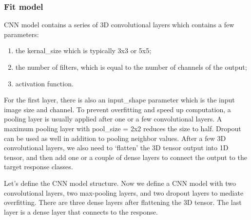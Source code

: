 \documentclass[12pt,]{krantz}
\begin{document}
\hypertarget{fit-model-1}{%
\subsubsection{Fit model}\label{fit-model-1}}

CNN model contains a series of 3D convolutional layers which contains a few parameters:

\begin{enumerate}
\def\labelenumi{(\arabic{enumi})}
\item
  the kernal\_size which is typically 3x3 or 5x5;
\item
  the number of filters, which is equal to the number of channels of the output;
\item
  activation function.
\end{enumerate}

For the first layer, there is also an input\_shape parameter which is the input image size and channel. To prevent overfitting and speed up computation, a pooling layer is usually applied after one or a few convolutional layers. A maximum pooling layer with pool\_size = 2x2 reduces the size to half. Dropout can be used as well in addition to pooling neighbor values. After a few 3D convolutional layers, we also need to `flatten' the 3D tensor output into 1D tensor, and then add one or a couple of dense layers to connect the output to the target response classes.

Let's define the CNN model structure. Now we define a CNN model with two convolutional layers, two max-pooling layers, and two dropout layers to mediate overfitting. There are three dense layers after flattening the 3D tensor. The last layer is a dense layer that connects to the response.
\end{document}
